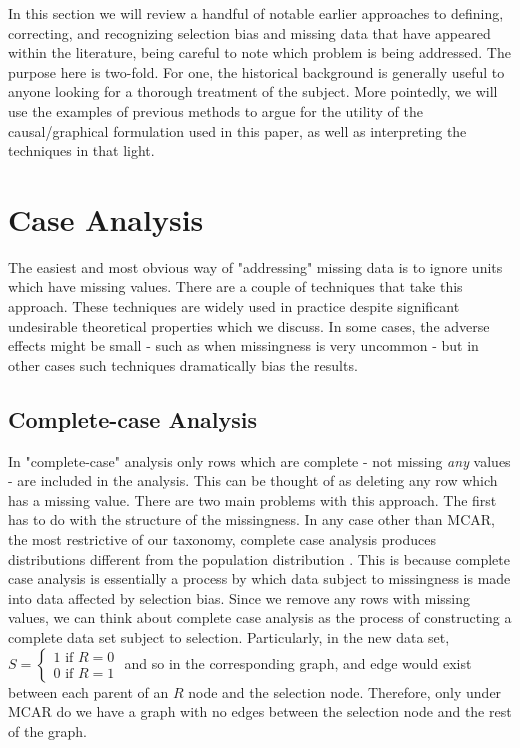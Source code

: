 \documentclass[12pt,twoside]{reedthesis}
\theoremstyle{definition}
\begin{document}
In this section we will review a handful of notable earlier approaches to defining, correcting, and recognizing selection bias and missing data that have appeared within the literature, being careful to note which problem is being addressed. The purpose here is two-fold. For one, the historical background is generally useful to anyone looking for a thorough treatment of the subject. More pointedly, we will use the examples of previous methods to argue for the utility of the causal/graphical formulation used in this paper, as well as interpreting the techniques in that light.


\section{Case Analysis}

The easiest and most obvious way of "addressing" missing data is to ignore units which have missing values. There are a couple of techniques that take this approach. These techniques are widely used in practice despite significant undesirable theoretical properties \citep{Little_1986} which we discuss. In some cases, the adverse effects might be small - such as when missingness is very uncommon - but in other cases such techniques dramatically bias the results. 

\subsection{Complete-case Analysis}
In "complete-case" analysis only rows which are complete - not missing \emph{any} values - are included in the analysis. This can be thought of as deleting any row which has a missing value. There are two main problems with this approach. The first has to do with the structure of the missingness. In any case other than MCAR, the most restrictive of our taxonomy, complete case analysis produces distributions different from the population distribution \citep{Little_1986}. This is because complete case analysis is essentially a process by which data subject to missingness is made into data affected by selection bias. Since we remove any rows with missing values, we can think about complete case analysis as the process of constructing a complete data set subject to selection. Particularly, in the new data set, $S= \begin{cases}1 \text{ if } R=0 \\ 0 \text{ if } R = 1 \end{cases}$ and so in the corresponding graph, and edge would exist between each parent of an $R$ node and the selection node. Therefore, only under MCAR do we have a graph with no edges between the selection node and the rest of the graph.
\end{document}
